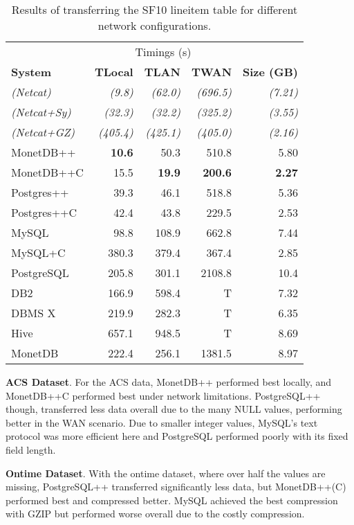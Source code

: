 \documentclass[sigconf]{acmart}
\begin{document}
\begin{table}[h!]
    \centering
    \caption{Results of transferring the SF10 lineitem table for different network configurations.}
    \begin{tabular}{ l | r  r  r  r }
    		 & \multicolumn{3}{c}{Timings (s)} &  \\ 
        \textbf{System} & \textbf{T{\small Local}} & \textbf{T{\small LAN}} & \textbf{T{\small WAN}} &  \textbf{Size (GB)}\\ \hline
        \textit{(Netcat)} & \textit{(9.8)} & \textit{(62.0)} & \textit{(696.5)} & \textit{(7.21)} \\ 
        \textit{(Netcat+Sy)} & \textit{(32.3)} & \textit{(32.2)} & \textit{(325.2)} & \textit{(3.55)} \\ 
        \textit{(Netcat+GZ)} & \textit{(405.4)} & \textit{(425.1)} & \textit{(405.0)} & \textit{(2.16)} \\ 
        MonetDB++ & \textbf{10.6} & 50.3 & 510.8 & 5.80 \\ 
        MonetDB++C & 15.5 & \textbf{19.9} & \textbf{200.6} & \textbf{2.27} \\ 
        Postgres++ & 39.3 & 46.1 & 518.8 & 5.36 \\ 
        Postgres++C & 42.4 & 43.8 & 229.5 & 2.53 \\ 
        MySQL & 98.8 & 108.9 & 662.8 & 7.44 \\ 
        MySQL+C & 380.3 & 379.4 & 367.4 & 2.85 \\ 
        PostgreSQL & 205.8 & 301.1 & 2108.8 & 10.4 \\ 
        DB2 & 166.9 & 598.4 & T & 7.32 \\ 
        DBMS X & 219.9 & 282.3 & T & 6.35 \\ 
        Hive & 657.1 & 948.5 & T & 8.69 \\ 
        MonetDB & 222.4 & 256.1 & 1381.5 & 8.97 \\ 
    \end{tabular}
\end{table}

\textbf{ACS Dataset}. For the ACS data, MonetDB++ performed best locally, and MonetDB++C performed best under network limitations. PostgreSQL++ though, transferred less data overall due to the many NULL values, performing better in the WAN scenario. Due to smaller integer values, MySQL's text protocol was more efficient here and PostgreSQL performed poorly with its fixed field length. 

\textbf{Ontime Dataset}. With the ontime dataset, where over half the values are missing, PostgreSQL++ transferred significantly less data, but MonetDB++(C) performed best and compressed better. MySQL achieved the best compression with GZIP but performed worse overall due to the costly compression. 
\end{document}
